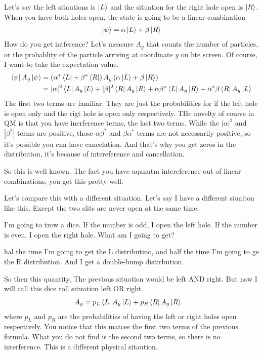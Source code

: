 Let's say the left sitautions is $\ket{L}$
and the situation for the right hole open is $\ket{R}$.
When you have both holes open,
the state is going to be a linear combination
\begin{align}
    \ket{\psi} = \alpha\ket{L} + \beta\ket{R}
\end{align}
How do you get intference?
Let's measure $A_y$ that counts the number of particles,
or the probablity of the particle arriving at coordinate $y$
on hte screen.
Of course,
I want to take the expectation value.
\begin{align}
    \bra{\psi} A_y \ket{\psi} &=
    \left( \alpha^* \bra{L} + \beta^*\bra{R} \right)
    A_y
    \left( \alpha\ket{L} + \beta\ket{R} \right)\\
    &=
    |\alpha|^2 \bra{L}A_y\ket{L}
    + |\beta|^2 \bra{R}A_y\ket{R}
    + \alpha\beta^* \bra{L}A_y\ket{R}
    + \alpha^*\beta \bra{R}A_y\ket{L}
\end{align}
The first two terms are familiar.
They are just the probabilities for if the left hole is open only
and the rigt hole is open only respectively.
THe novelty of course in QM is that you have inerference terms,
the last two terms.
While the $|\alpha|^2$ and $|\beta^2|$ terms are positive,
those $\alpha\beta^*$ and $\beta\alpha^*$ terms are not necessarily positive,
so it's possible you cna have cancelation.
And that's why you get zeros in the distribution,
it's because of intereference and cancellation.

So this is well known.
The fact you have uqanutm intereference out of linear combinations,
you get this pretty well.

Let's compare this with a different situation.
Let's say I have a different siuaiton like this.
Except the two slits are never open at the same time.

I'm going to trow a dice.
If the number is odd,
I open the left hole.
If the number is even,
I open the right hole.
What am I going to get?

hal the time I'm going to get the L distributino,
and half the time I'm going to ge the R distribution.
And I get a double-bump distirbution.

So then this quantity,
The previous situation would be left AND right.
But now I will call this dice roll situation left OR right.
\begin{align}
    \bar{A}_y &=
    p_L \bra{L}A_y\ket{L}
    + p_R \bra{R}A_y\ket{R}
\end{align}
where $p_L$ and $p_R$ are the probabilities of having the left or right holes
open respectively.
You notice that this matces the first two terms of the previous formula.
What you do not find is the second two terms,
so there is no interference.
This is a different physical sitaution.

